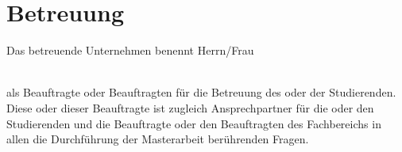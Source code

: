 \section{Betreuung}

Das betreuende Unternehmen benennt Herrn/Frau \\ \\
\spaceLineBigger


als Beauftragte oder Beauftragten für die Betreuung des oder der Studierenden. Diese oder dieser Beauftragte ist zugleich Ansprechpartner für die oder den Studierenden und die Beauftragte oder den Beauftragten des Fachbereichs \departement in allen die Durchführung der Masterarbeit berührenden Fragen.